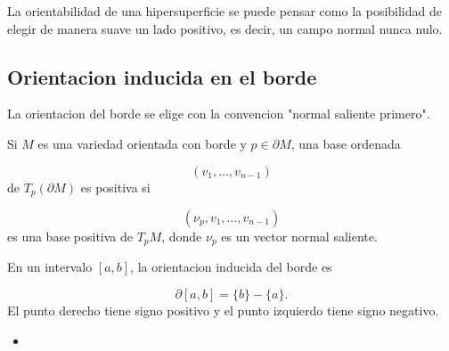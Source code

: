 \begin{bookremark}{}
La orientabilidad de una hipersuperficie se puede pensar como la posibilidad de elegir de manera suave un lado positivo, es decir, un campo normal nunca nulo.

\end{bookremark}
\subsection{Orientacion inducida en el borde}
\begin{bookremark}{}
La orientacion del borde se elige con la convencion "normal saliente primero".

Si $M$ es una variedad orientada con borde y $p\in\partial M$, una base ordenada

\[
(v_1,\ldots,v_{n-1})
\]
de $T_p(\partial M)$ es positiva si

\[
(\nu_p,v_1,\ldots,v_{n-1})
\]
es una base positiva de $T_pM$, donde $\nu_p$ es un vector normal saliente.

\end{bookremark}
\begin{bookexample}{}
En un intervalo $[a,b]$, la orientacion inducida del borde es

\[
\partial[a,b]=\{b\}-\{a\}.
\]
El punto derecho tiene signo positivo y el punto izquierdo tiene signo negativo.

\end{bookexample}
\begin{itemize}
\item [ ]
\end{itemize}
